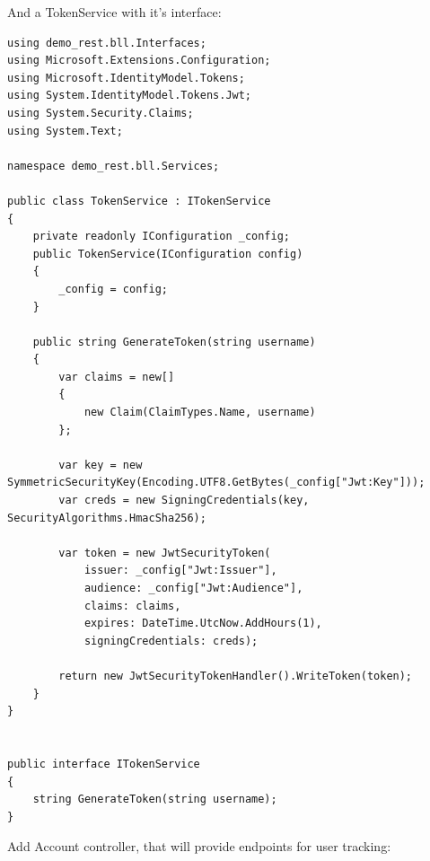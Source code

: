 And a TokenService with it's interface:

\begin{lstlisting}
using demo_rest.bll.Interfaces;
using Microsoft.Extensions.Configuration;
using Microsoft.IdentityModel.Tokens;
using System.IdentityModel.Tokens.Jwt;
using System.Security.Claims;
using System.Text;

namespace demo_rest.bll.Services;

public class TokenService : ITokenService
{
    private readonly IConfiguration _config;
    public TokenService(IConfiguration config)
    {
        _config = config;
    }

    public string GenerateToken(string username)
    {
        var claims = new[]
        {
            new Claim(ClaimTypes.Name, username)
        };

        var key = new SymmetricSecurityKey(Encoding.UTF8.GetBytes(_config["Jwt:Key"]));
        var creds = new SigningCredentials(key, SecurityAlgorithms.HmacSha256);

        var token = new JwtSecurityToken(
            issuer: _config["Jwt:Issuer"],
            audience: _config["Jwt:Audience"],
            claims: claims,
            expires: DateTime.UtcNow.AddHours(1),
            signingCredentials: creds);

        return new JwtSecurityTokenHandler().WriteToken(token);
    }
}


public interface ITokenService
{
    string GenerateToken(string username);
}

\end{lstlisting}

Add Account controller, that will provide endpoints for user tracking:

